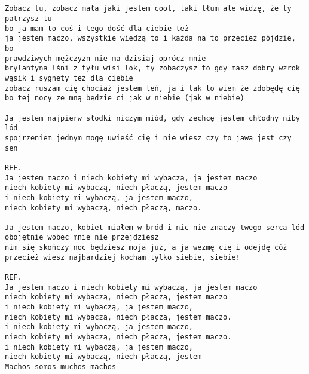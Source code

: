 \documentclass[12pt]{article}
\begin{document}
\subsection*{}
\begin{verbatim}
Zobacz tu, zobacz mała jaki jestem cool, taki tłum ale widzę, że ty patrzysz tu
bo ja mam to coś i tego dość dla ciebie też
ja jestem maczo, wszystkie wiedzą to i każda na to przecież pójdzie, bo
prawdziwych mężczyzn nie ma dzisiaj oprócz mnie
brylantyna lśni z tyłu wisi lok, ty zobaczysz to gdy masz dobry wzrok
wąsik i sygnety też dla ciebie
zobacz ruszam cię chociaż jestem leń, ja i tak to wiem że zdobędę cię
bo tej nocy ze mną będzie ci jak w niebie (jak w niebie)

Ja jestem najpierw słodki niczym miód, gdy zechcę jestem chłodny niby lód
spojrzeniem jednym mogę uwieść cię i nie wiesz czy to jawa jest czy sen

REF.
Ja jestem maczo i niech kobiety mi wybaczą, ja jestem maczo
niech kobiety mi wybaczą, niech płaczą, jestem maczo
i niech kobiety mi wybaczą, ja jestem maczo,
niech kobiety mi wybaczą, niech płaczą, maczo.

Ja jestem maczo, kobiet miałem w bród i nic nie znaczy twego serca lód
obojętnie wobec mnie nie przejdziesz
nim się skończy noc będziesz moja już, a ja wezmę cię i odejdę cóż
przecież wiesz najbardziej kocham tylko siebie, siebie!

REF.
Ja jestem maczo i niech kobiety mi wybaczą, ja jestem maczo
niech kobiety mi wybaczą, niech płaczą, jestem maczo
i niech kobiety mi wybaczą, ja jestem maczo,
niech kobiety mi wybaczą, niech płaczą, jestem maczo.
i niech kobiety mi wybaczą, ja jestem maczo,
niech kobiety mi wybaczą, niech płaczą, jestem maczo.
i niech kobiety mi wybaczą, ja jestem maczo,
niech kobiety mi wybaczą, niech płaczą, jestem
Machos somos muchos machos
\end{verbatim}
\clearpage
\end{document}
